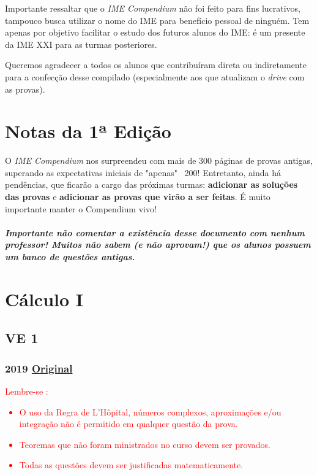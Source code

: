 \documentclass[12pt,a4paper]{article}
\newcommand{\original}[1]{\tiny \href{#1}{Original} \normalsize}
\begin{document}
Importante ressaltar que o \textit{IME Compendium} não foi feito para fins lucrativos, tampouco busca utilizar o nome do IME para benefício pessoal de ninguém. Tem apenas por objetivo facilitar o estudo dos futuros alunos do IME: é um presente da IME XXI para as turmas posteriores.

Queremos agradecer a todos os alunos que contribuíram direta ou indiretamente para a confecção desse compilado (especialmente aos que atualizam o \textit{drive} com as provas).

\newpage

\section{Notas da 1ª Edição}

O \textit{IME Compendium} nos surpreendeu com mais de 300 páginas de provas antigas, superando as expectativas iniciais de "apenas" \ 200! Entretanto, ainda há pendências, que ficarão a cargo das próximas turmas: \textbf{adicionar as soluções das provas} e \textbf{adicionar as provas que virão a ser feitas}. É muito importante manter o Compendium vivo!

\subparagraph{Importante não comentar a existência desse documento com nenhum professor! Muitos não sabem (e não aprovam!) que os alunos possuem um banco de questões antigas.}

\newpage

\section{Cálculo I}

\subsection{VE 1}

\subsubsection{2019 \original{https://drive.google.com/open?id=1GLY88aSS4XACsZc02IgCHsqeOmPx6P1V}}

\textcolor{red}{Lembre-se : 
\begin{itemize}
    \item O uso da Regra de L'Hôpital, números complexos, aproximações e/ou integração não é permitido em qualquer questão da prova.
    \item Teoremas que não foram ministrados no curso devem ser provados.
    \item Todas as questões devem ser justificadas matematicamente.
\end{itemize}
}
\end{document}

